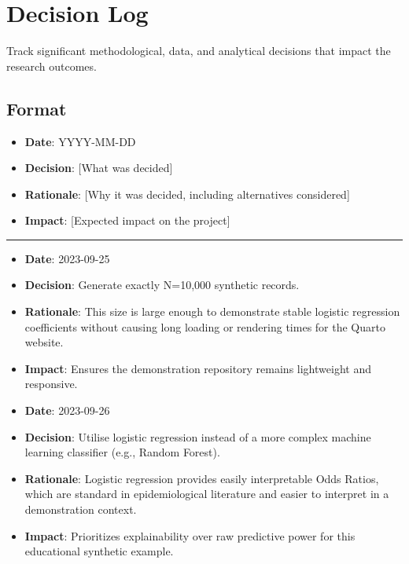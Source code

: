 \documentclass[
]{report}
\author{}
\date{}
\providecommand{\tightlist}{%
  \setlength{\itemsep}{0pt}\setlength{\parskip}{0pt}}
\renewcommand*\contentsname{Table of contents}
\newcommand\contentsname{Table of contents}
\begin{document}
\renewcommand*\contentsname{Table of contents}
{
\hypersetup{linkcolor=}
\setcounter{tocdepth}{2}
\tableofcontents
}

\chapter{Decision Log}\label{decision-log}

Track significant methodological, data, and analytical decisions that
impact the research outcomes.

\section{Format}\label{format}

\begin{itemize}
\tightlist
\item
  \textbf{Date}: YYYY-MM-DD
\item
  \textbf{Decision}: {[}What was decided{]}
\item
  \textbf{Rationale}: {[}Why it was decided, including alternatives
  considered{]}
\item
  \textbf{Impact}: {[}Expected impact on the project{]}
\end{itemize}

\begin{center}\rule{0.5\linewidth}{0.5pt}\end{center}

\begin{itemize}
\item
  \textbf{Date}: 2023-09-25
\item
  \textbf{Decision}: Generate exactly N=10,000 synthetic records.
\item
  \textbf{Rationale}: This size is large enough to demonstrate stable
  logistic regression coefficients without causing long loading or
  rendering times for the Quarto website.
\item
  \textbf{Impact}: Ensures the demonstration repository remains
  lightweight and responsive.
\item
  \textbf{Date}: 2023-09-26
\item
  \textbf{Decision}: Utilise logistic regression instead of a more
  complex machine learning classifier (e.g., Random Forest).
\item
  \textbf{Rationale}: Logistic regression provides easily interpretable
  Odds Ratios, which are standard in epidemiological literature and
  easier to interpret in a demonstration context.
\item
  \textbf{Impact}: Prioritizes explainability over raw predictive power
  for this educational synthetic example.
\end{itemize}
\end{document}
